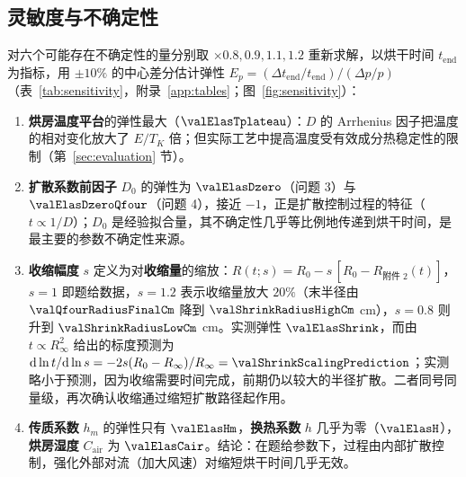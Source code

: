 \subsection{灵敏度与不确定性}
\label{subsec:sensitivity}

对六个可能存在不确定性的量分别取 $\times0.8,0.9,1.1,1.2$ 重新求解，以烘干时间 $t_{\mathrm{end}}$ 为指标，用 $\pm10\%$ 的中心差分估计弹性 $E_p=(\Delta t_{\mathrm{end}}/t_{\mathrm{end}})/(\Delta p/p)$（表~\ref{tab:sensitivity}，附录~\ref{app:tables}；图~\ref{fig:sensitivity}）：


\begin{enumerate}[leftmargin=*,itemsep=0.2em]
  \item \textbf{烘房温度平台}的弹性最大（$\valElasTplateau$）：$D$ 的 Arrhenius 因子把温度的相对变化放大了 $E/T_K$ 倍；但实际工艺中提高温度受有效成分热稳定性的限制（第~\ref{sec:evaluation} 节）。
  \item \textbf{扩散系数前因子} $D_0$ 的弹性为 $\valElasDzero$（问题 3）与 $\valElasDzeroQfour$（问题 4），接近 $-1$，正是扩散控制过程的特征（$t\propto1/D$）；$D_0$ 是经验拟合量，其不确定性几乎等比例地传递到烘干时间，是最主要的参数不确定性来源。
  \item \textbf{收缩幅度} $s$ 定义为对\textbf{收缩量}的缩放：$R(t;s)=R_0-s\,[R_0-R_{\text{附件 2}}(t)]$，$s=1$ 即题给数据，$s=1.2$ 表示收缩量放大 $20\%$（末半径由 $\valQfourRadiusFinalCm$ 降到 $\valShrinkRadiusHighCm$ \si{\centi\meter}），$s=0.8$ 则升到 $\valShrinkRadiusLowCm$ \si{\centi\meter}。实测弹性 $\valElasShrink$，而由 $t\propto R_\infty^2$ 给出的标度预测为 $\dd\ln t/\dd\ln s=-2s(R_0-R_\infty)/R_\infty=\valShrinkScalingPrediction$；实测略小于预测，因为收缩需要时间完成，前期仍以较大的半径扩散。二者同号同量级，再次确认收缩通过缩短扩散路径起作用。
  \item \textbf{传质系数} $h_m$ 的弹性只有 $\valElasHm$，\textbf{换热系数} $h$ 几乎为零（$\valElasH$），\textbf{烘房湿度} $C_{\mathrm{air}}$ 为 $\valElasCair$。结论：在题给参数下，过程由内部扩散控制，强化外部对流（加大风速）对缩短烘干时间几乎无效。
\end{enumerate}


